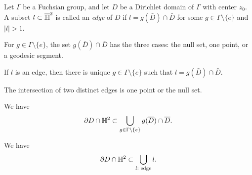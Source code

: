 \documentclass[a4paper]{article}
\begin{document}
\begin{prb}
Let $\Gamma$ be a Fuchsian group, and let $D$ be a Dirichlet domain of $\Gamma$ with center $z_0$.
A subset $l\subset\overline{\mathbb{H}}^2$ is called an \emph{edge} of $D$ if $l=g(\bar D)\cap\bar D$ for some $g\in\Gamma\setminus\{e\}$ and $|l|>1$.
\begin{parts}
\item For $g\in\Gamma\setminus\{e\}$, the set $g(\bar D)\cap\bar D$ has the three cases: the null set, one point, or a geodesic segment.
\item If $l$ is an edge, then there is unique $g\in\Gamma\setminus\{e\}$ such that $l=g(\bar D)\cap\bar D$.
\item The intersection of two distinct edges is one point or the null set.
\item We have
\[\partial D\cap\mathbb{H}^2\subset\bigcup_{g\in\Gamma\setminus\{e\}}g(\overline D)\cap\overline D.\]
\item We have
\[\partial D\cap\mathbb{H}^2\subset\bigcup_{l:\text{ edge}}l.\]
\end{parts}
\end{prb}
\end{document}
